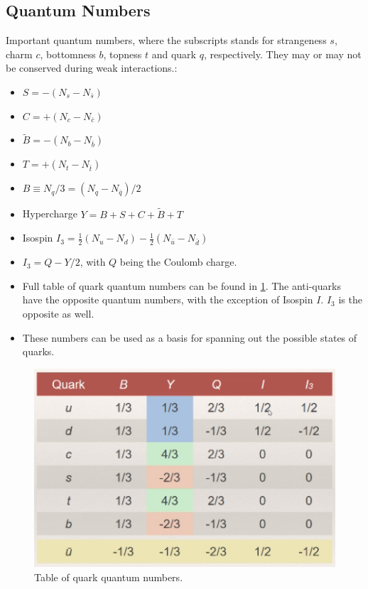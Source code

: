 \subsection{Quantum Numbers}
Important quantum numbers, where the subscripts stands for strangeness $s$, charm $c$, bottomness $b$, topness $t$ and quark $q$, respectively. They may or may not be conserved during weak interactions.:
\begin{itemize}
    \item $S = - (N_s - N_{\bar{s}})$
    \item $C = + (N_c - N_{\bar{c}})$
    \item $\tilde{B} = - (N_{b} - N_{\bar{b}})$
    \item $T = + (N_t - N_{\bar{t}})$
    \item $B ≡ N_q / 3 = \left(N_q - N_{\bar{q}}\right) / 2$
    \item Hypercharge $Y = B + S + C + \tilde{B} + T$
    \item Isospin $I_3 = \frac{1}{2}(N_u - N_d) - \frac{1}{2}(N_{\bar{u}} - N_{\bar{d}})$
    \item $I_3 = Q - Y / 2$, with $Q$ being the Coulomb charge.
    \item Full table of quark quantum numbers can be found in \cref{fig: quark_quantum_numbers}. The anti-quarks have the opposite quantum numbers, with the exception of Isospin $I$. $I_3$ is the opposite as well. 
    \item These numbers can be used as a basis for spanning out the possible states of quarks. 
\end{itemize}
\begin{figure}[h!]
\centering
\includegraphics[width = .5\textwidth]{quark_quantum_numbers.png}
\caption{Table of quark quantum numbers.}
\label{fig: quark_quantum_numbers}
\end{figure}


